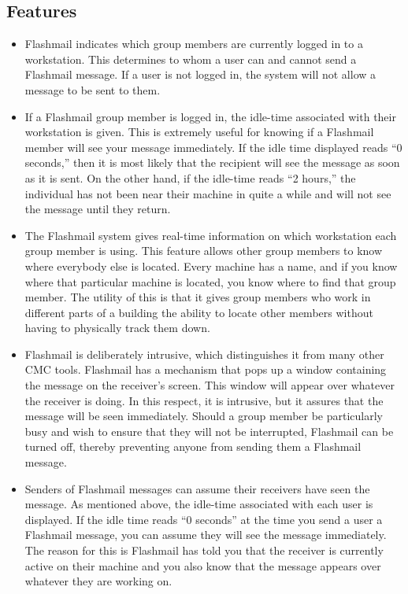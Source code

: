 \subsection{Features}
\begin{itemize}
\item Flashmail indicates which group members are currently logged in to a
  workstation. This determines to whom a user can and cannot send a Flashmail
  message.  If a user is not logged in, the system will not allow a
  message to be sent to them.

\item If a Flashmail group member is logged in, the idle-time associated
  with their workstation is given. This is extremely useful for knowing if
  a Flashmail member will see your message immediately.  If the idle time
  displayed reads ``0 seconds,'' then it is most likely that the recipient
  will see the message as soon as it is sent.  On the other hand, if the
  idle-time reads ``2 hours,'' the individual has not been near their
  machine in quite a while and will not see the message until they return.

\item The Flashmail system gives real-time information on which workstation
  each group member is using.  This feature allows other group members to
  know where everybody else is located.  Every machine has a name, and if
  you know where that particular machine is located, you know where to find
  that group member.  The utility of this is that it gives group members
  who work in different parts of a building the ability to locate other
  members without having to physically track them down.

\item Flashmail is deliberately intrusive, which distinguishes it from many
  other CMC tools.  Flashmail has a mechanism that pops up a window
  containing the message on the receiver's screen.  This window will appear
  over whatever the receiver is doing.  In this respect, it is intrusive,
  but it assures that the message will be seen immediately.  Should a group
  member be particularly busy and wish to ensure that they will not be
  interrupted, Flashmail can be turned off, thereby preventing anyone from
  sending them a Flashmail message.

\item Senders of Flashmail messages can assume their receivers have seen
  the message. As mentioned above, the idle-time associated with each user
  is displayed. If the idle time reads ``0 seconds'' at the time you
  send a user a Flashmail message, you can assume they will see the
  message immediately.   The reason for this is Flashmail has told you that
  the receiver is currently active on their machine and you
  also know that the message appears over whatever they are working on.


\end{itemize}
